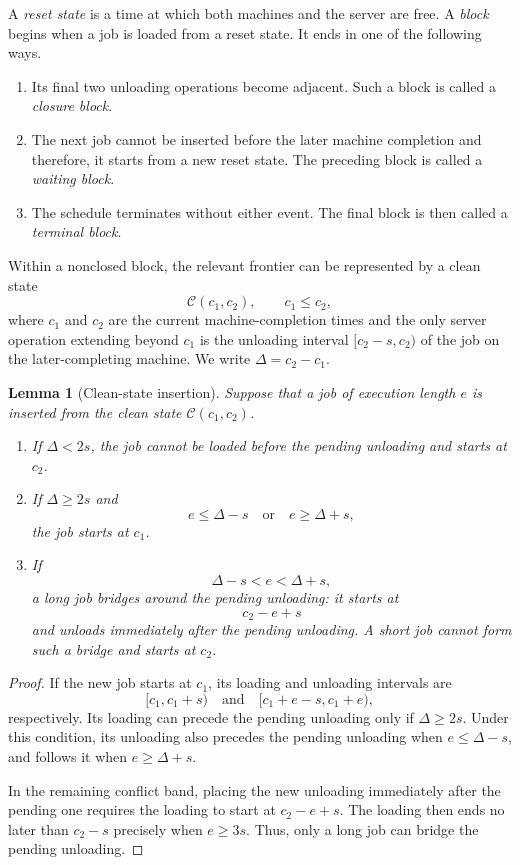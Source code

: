 \documentclass[11pt]{article}
\newtheorem{lemma}{Lemma}
\begin{document}
A \emph{reset state} is a time at which both machines and the server are free. A
\emph{block} begins when a job is loaded from a reset state. It ends in one of
the following ways.

\begin{enumerate}
\item Its final two unloading operations become adjacent. Such a block is called
      a \emph{closure block}.
\item The next job cannot be inserted before the later machine completion and
      therefore, it starts from a new reset state. The preceding block is called a
      \emph{waiting block}.
\item The schedule terminates without either event. The final block is then
      called a \emph{terminal block}.
\end{enumerate}

Within a nonclosed block, the relevant frontier can be represented by a clean
state
\[
\mathcal C(c_1,c_2),\qquad c_1\le c_2,
\]
where \(c_1\) and \(c_2\) are the current machine-completion times and the only server operation extending beyond \(c_1\) is the unloading interval \([c_2-s,c_2)\) of the job on the later-completing machine. We write \(\Delta=c_2-c_1\).

\begin{lemma}[Clean-state insertion]
\label{lem:lpt-clean-insertion}
Suppose that a job of execution length \(e\) is inserted from the clean state
\(\mathcal C(c_1,c_2)\).

\begin{enumerate}
\item If \(\Delta<2s\), the job cannot be loaded before the pending unloading
      and starts at \(c_2\).
\item If \(\Delta\ge2s\) and
      \[
      e\le\Delta-s
      \quad\text{or}\quad
      e\ge\Delta+s,
      \]
      the job starts at \(c_1\).
\item If
      \[
      \Delta-s<e<\Delta+s,
      \]
      a long job bridges around the pending unloading: it starts at
      \[
      c_2-e+s
      \]
      and unloads immediately after the pending unloading. A short job cannot
      form such a bridge and starts at \(c_2\).
\end{enumerate}
\end{lemma}

\begin{proof}
If the new job starts at \(c_1\), its loading and unloading intervals are
\[
[c_1,c_1+s)
\quad\text{and}\quad
[c_1+e-s,c_1+e),
\]
respectively. Its loading can precede the pending unloading only if
\(\Delta\ge2s\). Under this condition, its unloading also precedes the pending
unloading when \(e\le\Delta-s\), and follows it when \(e\ge\Delta+s\).

In the remaining conflict band, placing the new unloading immediately after the
pending one requires the loading to start at \(c_2-e+s\). The loading then ends
no later than \(c_2-s\) precisely when \(e\ge3s\). Thus, only a long job can
bridge the pending unloading.
\end{proof}
\end{document}
